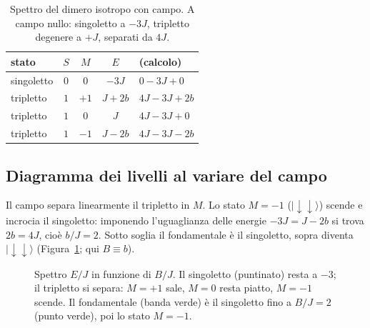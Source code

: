 \documentclass[11pt,a4paper]{article}
\newcommand{\ket}[1]{\lvert #1 \rangle}
\newcommand{\up}{\uparrow}
\newcommand{\dn}{\downarrow}
\theoremstyle{definition}
\theoremstyle{remark}
\begin{document}
\begin{table}[htbp]
\centering
\begin{tabular}{lcccl}
\toprule
stato & $S$ & $M$ & $E$ & (calcolo)\\
\midrule
singoletto & $0$ & $0$ & $-3J$ & $0-3J+0$\\
tripletto & $1$ & $+1$ & $J+2b$ & $4J-3J+2b$\\
tripletto & $1$ & $0$ & $J$ & $4J-3J+0$\\
tripletto & $1$ & $-1$ & $J-2b$ & $4J-3J-2b$\\
\bottomrule
\end{tabular}
\caption{Spettro del dimero isotropo con campo. A campo nullo: singoletto a $-3J$, tripletto degenere a
$+J$, separati da $4J$.}
\label{tab:livelli}
\end{table}

\subsection{Diagramma dei livelli al variare del campo}

Il campo separa linearmente il tripletto in $M$. Lo stato $M=-1$ ($\ket{\dn\dn}$) scende e incrocia il
singoletto: imponendo l'uguaglianza delle energie $-3J=J-2b$ si trova $2b=4J$, cioè $b/J=2$. Sotto soglia
il fondamentale è il singoletto, sopra diventa $\ket{\dn\dn}$ (Figura~\ref{fig:spettro}; qui $B\equiv b$).

\begin{figure}[htbp]
\centering
{}
\caption{Spettro $E/J$ in funzione di $B/J$. Il singoletto (puntinato) resta a $-3$; il tripletto si
separa: $M{=}{+}1$ sale, $M{=}0$ resta piatto, $M{=}{-}1$ scende. Il fondamentale (banda verde) è il
singoletto fino a $B/J=2$ (punto verde), poi lo stato $M{=}{-}1$.}
\label{fig:spettro}
\end{figure}
\end{document}

